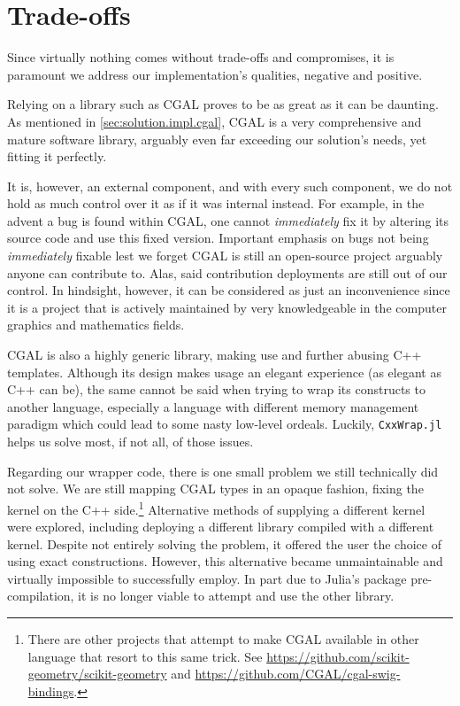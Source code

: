 \section{Trade-offs}%
\label{sec:solution.tradeoffs}

Since virtually nothing comes without trade-offs and compromises, it is
paramount we address our implementation's qualities, negative and positive.

Relying on a library such as \ac{CGAL} proves to be as great as it can be
daunting.  As mentioned in \cref{sec:solution.impl.cgal}, \ac{CGAL} is a very
comprehensive and mature software library, arguably even far exceeding our
solution's needs, yet fitting it perfectly.

It is, however, an external component, and with every such component, we do not
hold as much control over it as if it was internal instead.  For example, in the
advent a bug is found within \ac{CGAL}, one cannot \emph{immediately} fix it by
altering its source code and use this fixed version.  Important emphasis on bugs
not being \emph{immediately} fixable lest we forget \ac{CGAL} is still an
open-source project arguably anyone can contribute to.  Alas, said contribution
deployments are still out of our control.  In hindsight, however, it can be
considered as just an inconvenience since it is a project that is actively
maintained by very knowledgeable in the computer graphics and mathematics
fields.

\Ac{CGAL} is also a highly generic library, making use and further abusing C++
templates.  Although its design makes usage an elegant experience (as elegant as
C++ can be), the same cannot be said when trying to wrap its constructs to
another language, especially a language with different memory management
paradigm which could lead to some nasty low-level ordeals.  Luckily,
\texttt{CxxWrap.jl} helps us solve most, if not all, of those issues.

Regarding our wrapper code,  there is one small problem we still technically did
not solve.  We are still mapping \ac{CGAL} types in an opaque fashion, fixing
the kernel on the C++ side.\footnote{There are other projects that attempt to
make \ac{CGAL} available in other language that resort to this same trick. See
\url{https://github.com/scikit-geometry/scikit-geometry} and
\url{https://github.com/CGAL/cgal-swig-bindings}.}  Alternative methods of
supplying a different kernel were explored, including deploying a different
library compiled with a different kernel.  Despite not entirely solving the
problem, it offered the user the choice of using exact constructions.  However,
this alternative became unmaintainable and virtually impossible to successfully
employ.  In part due to Julia's package pre-compilation, it is no longer viable
to attempt and use the other library.

